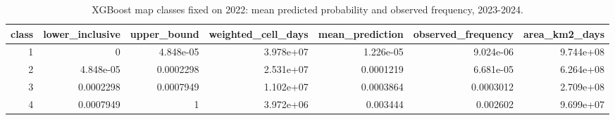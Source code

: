 \begin{table}
\caption{XGBoost map classes fixed on 2022: mean predicted probability and observed frequency, 2023-2024.}
\label{tab:T11_map_classes}
\begin{tabular}{rrrrrrr}
\toprule
class & lower_inclusive & upper_bound & weighted_cell_days & mean_prediction & observed_frequency & area_km2_days \\
\midrule
1 & 0 & 4.848e-05 & 3.978e+07 & 1.226e-05 & 9.024e-06 & 9.744e+08 \\
2 & 4.848e-05 & 0.0002298 & 2.531e+07 & 0.0001219 & 6.681e-05 & 6.264e+08 \\
3 & 0.0002298 & 0.0007949 & 1.102e+07 & 0.0003864 & 0.0003012 & 2.709e+08 \\
4 & 0.0007949 & 1 & 3.972e+06 & 0.003444 & 0.002602 & 9.699e+07 \\
\bottomrule
\end{tabular}
\end{table}
